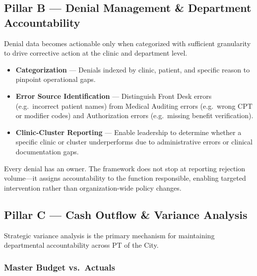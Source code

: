 \documentclass[11pt,a4paper]{article}
\begin{document}
\subsection{Pillar B --- Denial Management \& Department Accountability}

Denial data becomes actionable only when categorized with sufficient granularity to drive
corrective action at the clinic and department level.

\begin{itemize}
  \item \textbf{Categorization} --- Denials indexed by clinic, patient, and specific reason
        to pinpoint operational gaps.
  \item \textbf{Error Source Identification} --- Distinguish Front Desk errors (e.g.\ incorrect
        patient names) from Medical Auditing errors (e.g.\ wrong CPT or modifier codes) and
        Authorization errors (e.g.\ missing benefit verification).
  \item \textbf{Clinic-Cluster Reporting} --- Enable leadership to determine whether a specific
        clinic or cluster underperforms due to administrative errors or clinical documentation
        gaps.
\end{itemize}

\begin{tcolorbox}[warnbox,title={Operational Principle}]
Every denial has an owner. The framework does not stop at reporting rejection volume---it
assigns accountability to the function responsible, enabling targeted intervention rather
than organization-wide policy changes.
\end{tcolorbox}

\subsection{Pillar C --- Cash Outflow \& Variance Analysis}

Strategic variance analysis is the primary mechanism for maintaining departmental
accountability across PT of the City.

\subsubsection{Master Budget vs.\ Actuals}
\end{document}
